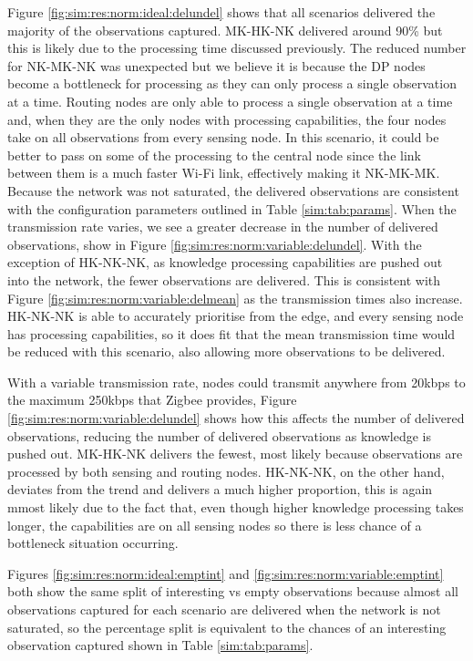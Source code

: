 Figure \ref{fig:sim:res:norm:ideal:delundel} shows that all scenarios delivered the majority of the observations captured. MK-HK-NK delivered around 90\% but this is likely due to the processing time discussed previously. The reduced number for NK-MK-NK was unexpected but we believe it is because the DP nodes become a bottleneck for processing as they can only process a single observation at a time. Routing nodes are only able to process a single observation at a time and, when they are the only nodes with processing capabilities, the four nodes take on all observations from every sensing node. In this scenario, it could be better to pass on some of the processing to the central node since the link between them is a much faster Wi-Fi link, effectively making it NK-MK-MK. Because the network was not saturated, the delivered observations are consistent with the configuration parameters outlined in Table \ref{sim:tab:params}. When the transmission rate varies, we see a greater decrease in the number of delivered observations, show in Figure \ref{fig:sim:res:norm:variable:delundel}. With the exception of HK-NK-NK, as knowledge processing capabilities are pushed out into the network, the fewer observations are delivered. This is consistent with Figure \ref{fig:sim:res:norm:variable:delmean} as the transmission times also increase. HK-NK-NK is able to accurately prioritise from the edge, and every sensing node has processing capabilities, so it does fit that the mean transmission time would be reduced with this scenario, also allowing more observations to be delivered.

With a variable transmission rate, nodes could transmit anywhere from 20kbps to the maximum 250kbps that Zigbee provides, Figure \ref{fig:sim:res:norm:variable:delundel} shows how this affects the number of delivered observations, reducing the number of delivered observations as knowledge is pushed out. MK-HK-NK delivers the fewest, most likely because observations are processed by both sensing and routing nodes. HK-NK-NK, on the other hand, deviates from the trend and delivers a much higher proportion, this is again mmost likely due to the fact that, even though higher knowledge processing takes longer, the capabilities are on all sensing nodes so there is less chance of a bottleneck situation occurring.

Figures \ref{fig:sim:res:norm:ideal:emptint} and \ref{fig:sim:res:norm:variable:emptint} both show the same split of interesting vs empty observations because almost all observations captured for each scenario are delivered when the network is not saturated, so the percentage split is equivalent to the chances of an interesting observation captured shown in Table \ref{sim:tab:params}.

